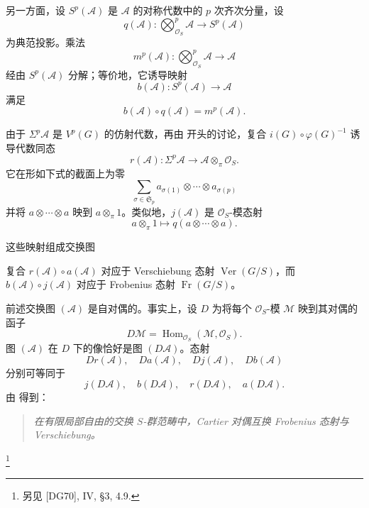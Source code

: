 另一方面，设 \(S^p(\mathcal A)\) 是 \(\mathcal A\) 的对称代数中的 \(p\) 次齐次分量，设
\[
  q(\mathcal A):
  \bigotimes_{\mathcal O_S}^p\mathcal A
  \longrightarrow
  S^p(\mathcal A)
\]
为典范投影。乘法
\[
  m^p(\mathcal A):
  \bigotimes_{\mathcal O_S}^p\mathcal A
  \longrightarrow
  \mathcal A
\]
经由 \(S^p(\mathcal A)\) 分解；等价地，它诱导映射
\[
  b(\mathcal A):
  S^p(\mathcal A)\longrightarrow\mathcal A
\]
满足
\[
  b(\mathcal A)\circ q(\mathcal A)
  =
  m^p(\mathcal A).
\]

由于 \(\Sigma^p\mathcal A\) 是 \(V^p(G)\) 的仿射代数，再由  开头的讨论，复合 \(i(G)\circ\varphi(G)^{-1}\) 诱导代数同态
\[
  r(\mathcal A):
  \Sigma^p\mathcal A
  \longrightarrow
  \mathcal A\otimes_\pi\mathcal O_S.
\]
它在形如下式的截面上为零
\[
  \sum_{\sigma\in\mathfrak S_p}
    a_{\sigma(1)}\otimes\cdots\otimes a_{\sigma(p)}
\]
并将 \(a\otimes\cdots\otimes a\) 映到 \(a\otimes_\pi1\)。类似地，\(j(\mathcal A)\) 是 \(\mathcal O_S\)-模态射
\[
  a\otimes_\pi1
  \longmapsto
  q(a\otimes\cdots\otimes a).
\]

这些映射组成交换图
\begin{center}
  \label{sga3:VIIA:4.3.3-cartier-duality-algebra-diagram}
  
\end{center}
复合 \(r(\mathcal A)\circ a(\mathcal A)\) 对应于 Verschiebung 态射 \(\operatorname{Ver}(G/S)\)，而 \(b(\mathcal A)\circ j(\mathcal A)\) 对应于 Frobenius 态射 \(\operatorname{Fr}(G/S)\)。

前述交换图 \((\mathcal A)\) 是自对偶的。事实上，设 \(D\) 为将每个 \(\mathcal O_S\)-模 \(\mathcal M\) 映到其对偶的函子
\[
  D\mathcal M
  =
  \operatorname{Hom}_{\mathcal O_S}
    (\mathcal M,\mathcal O_S).
\]
图 \((\mathcal A)\) 在 \(D\) 下的像恰好是图 \((D\mathcal A)\)。态射
\[
  Dr(\mathcal A),\quad
  Da(\mathcal A),\quad
  Dj(\mathcal A),\quad
  Db(\mathcal A)
\]
分别可等同于
\[
  j(D\mathcal A),\quad
  b(D\mathcal A),\quad
  r(D\mathcal A),\quad
  a(D\mathcal A).
\]
由  得到：

\begin{quote}
\textit{在有限局部自由的交换 \(S\)-群范畴中，Cartier 对偶互换 Frobenius 态射与 Verschiebung。}
\end{quote}
\footnote{另见 \textup{[DG70]}, IV, \S3, 4.9.}

